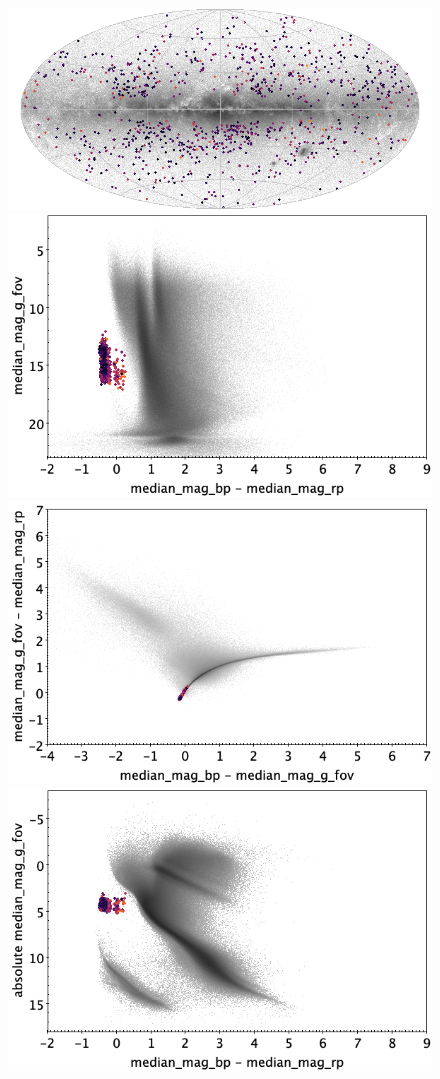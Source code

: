 \documentclass[longauth]{aa}
\begin{document}
\begin{appendix}
\begin{figure}
\centering
{}
\includegraphics[width=0.6\hsize]{figures/appendix/SDB_cls_sky.png} 
 \\ %
\vspace{4mm}
 \includegraphics[width=0.45\hsize]{figures/appendix/SDB_cls_cm.png}  %
\hspace{2mm}
 \includegraphics[width=0.45\hsize]{figures/appendix/SDB_cls_cc.png} \\ %
\vspace{4mm}
 \includegraphics[width=0.45\hsize]{figures/appendix/SDB_cls_cam.png}  %

\end{figure}
\end{appendix}
\end{document}
